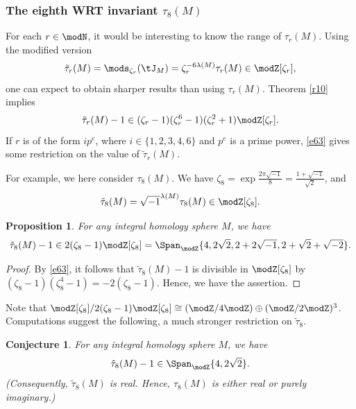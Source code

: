 \documentclass{amsart}
\numberwithin{equation}{section}
\numberwithin{figure}{section}
\theoremstyle{plain}
\newtheorem{proposition}[theorem]{Proposition}
\newtheorem{conjecture}[theorem]{Conjecture}
\theoremstyle{definition}
\theoremstyle{remark}
\begin{document}
\subsubsection{The eighth WRT invariant $\tau _8(M)$}
\label{sec:wrt-invariant-at}

For each $r\in \modN $, it would be interesting to know the range of
$\tau _r(M)$.  Using the modified version
\begin{equation*}
  \tilde\tau _r(M)=\mods _{\zeta _r}(\tJ_M)=\zeta _r^{-6\lambda (M)}\tau _r(M)\in \modZ [\zeta _r],
\end{equation*}
one can expect to obtain sharper results than using $\tau _r(M)$.
Theorem \ref{r10} implies
\begin{equation}
  \label{e63}
  \tilde\tau _r(M)-1
  \in 
  (\zeta _r-1)(\zeta _r^6-1)(\zeta _r^2+1)\modZ [\zeta _r].
\end{equation}
If $r$ is of the form $ip^e$, where $i\in \{1,2,3,4,6\}$ and $p^e$ is a
prime power, \eqref{e63} gives some restriction on the value of
$\tilde\tau _r(M)$.

For example, we here consider $\tau _8(M)$.  We have $\zeta _8=\exp
\frac{2\pi \sqrt{-1}}{8}=\frac{1+\sqrt{-1}}{\sqrt{2}}$, and
\begin{equation*}
  \tilde\tau _8(M)=\sqrt{-1}^{\lambda (M)}\tau _8(M)\in \modZ [\zeta _8].
\end{equation*}

\begin{proposition}
  \label{r11}
  For any integral homology sphere $M$, we have
  \begin{equation*}
    \tilde\tau _8(M)-1
    \in 2(\zeta _8-1)\modZ [\zeta _8]
    =\Span_\modZ \{4,2\sqrt2,2+2\sqrt{-1},2+\sqrt2+\sqrt{-2}\}.
  \end{equation*}
\end{proposition}

\begin{proof}
  By \eqref{e63}, it follows that $\tilde\tau _8(M)-1$ is divisible in
  $\modZ [\zeta _8]$ by $(\zeta _8-1)(\zeta _8^4-1)=-2(\zeta _8-1)$.  Hence, we have the
  assertion.
\end{proof}

Note that $\modZ [\zeta _8]/2(\zeta _8-1)\modZ [\zeta _8]\cong(\modZ /4\modZ )\oplus(\modZ /2\modZ )^3$.
Computations suggest the following, a much stronger restriction on
$\tilde\tau _8$.

\begin{conjecture}
  \label{r7}
  For any integral homology sphere $M$, we have
  \begin{equation*}
    \tilde\tau _8(M)-1
    \in \Span_\modZ \{4,2\sqrt2\}.
  \end{equation*}
  (Consequently, $\tilde\tau _8(M)$ is real.  Hence, $\tau _8(M)$ is either
  real or purely imaginary.)
\end{conjecture}
\end{document}
